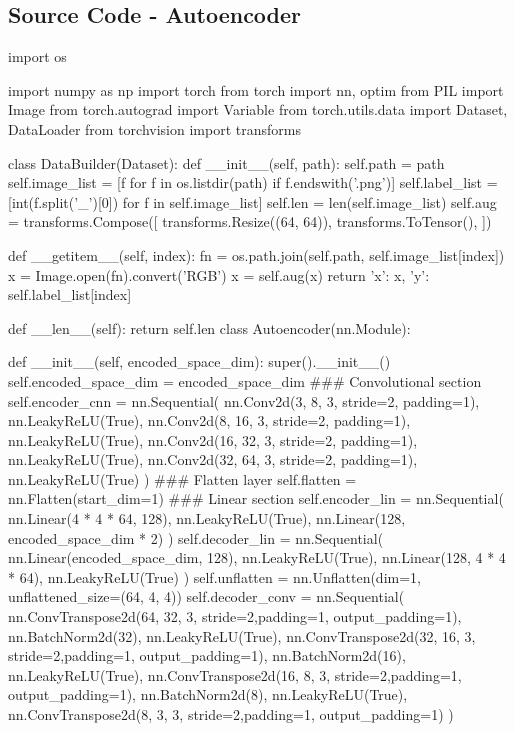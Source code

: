 \documentclass{article}
\begin{document}
\subsection{Source Code - Autoencoder}
\begin{python}
import os

import numpy as np
import torch
from torch import nn, optim
from PIL import Image
from torch.autograd import Variable
from torch.utils.data import Dataset, DataLoader
from torchvision import transforms


class DataBuilder(Dataset):
	def __init__(self, path):
		self.path = path
		self.image_list = [f for f in os.listdir(path) if f.endswith('.png')]
		self.label_list = [int(f.split('_')[0]) for f in self.image_list]
		self.len = len(self.image_list)
		self.aug = transforms.Compose([
			transforms.Resize((64, 64)),
			transforms.ToTensor(),
		])

	def __getitem__(self, index):
		fn = os.path.join(self.path, self.image_list[index])
		x = Image.open(fn).convert('RGB')
		x = self.aug(x)
		return {'x': x, 'y': self.label_list[index]}

	def __len__(self):
		return self.len
class Autoencoder(nn.Module):

	def __init__(self, encoded_space_dim):
		super().__init__()
		self.encoded_space_dim = encoded_space_dim
		### Convolutional section
		self.encoder_cnn = nn.Sequential(
			nn.Conv2d(3, 8, 3, stride=2, padding=1),
			nn.LeakyReLU(True),
			nn.Conv2d(8, 16, 3, stride=2, padding=1),
			nn.LeakyReLU(True),
			nn.Conv2d(16, 32, 3, stride=2, padding=1),
			nn.LeakyReLU(True),
			nn.Conv2d(32, 64, 3, stride=2, padding=1),
			nn.LeakyReLU(True)
		)
		### Flatten layer
		self.flatten = nn.Flatten(start_dim=1)
		### Linear section
		self.encoder_lin = nn.Sequential(
			nn.Linear(4 * 4 * 64, 128),
			nn.LeakyReLU(True),
			nn.Linear(128, encoded_space_dim * 2)
		)
		self.decoder_lin = nn.Sequential(
			nn.Linear(encoded_space_dim, 128),
			nn.LeakyReLU(True),
			nn.Linear(128, 4 * 4 * 64),
			nn.LeakyReLU(True)
		)
		self.unflatten = nn.Unflatten(dim=1, unflattened_size=(64, 4, 4))
		self.decoder_conv = nn.Sequential(
			nn.ConvTranspose2d(64, 32, 3, stride=2,padding=1, output_padding=1),
			nn.BatchNorm2d(32),
			nn.LeakyReLU(True),
			nn.ConvTranspose2d(32, 16, 3, stride=2,padding=1, output_padding=1),
			nn.BatchNorm2d(16),
			nn.LeakyReLU(True),
			nn.ConvTranspose2d(16, 8, 3, stride=2,padding=1, output_padding=1),
			nn.BatchNorm2d(8),
			nn.LeakyReLU(True),
			nn.ConvTranspose2d(8, 3, 3, stride=2,padding=1, output_padding=1)
		)


\end{python}
\end{document}
